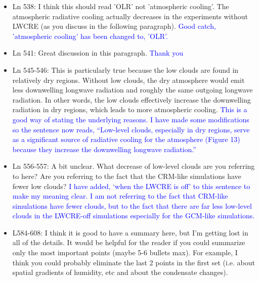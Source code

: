 \documentclass[draft]{agujournal2019}
\begin{document}
\begin{itemize}
  \item Ln 538: I think this should read 'OLR' not 'atmospheric cooling'. The atmospheric radiative cooling actually decreases in the experiments without LWCRE (as you discuss in the following paragraph). 
  \textcolor{blue}{Good catch, 'atmospheric cooling' has been changed to, 'OLR'.}
  
  \item Ln 541: Great discussion in this paragraph.  
  \textcolor{blue}{Thank you}
  
  \item Ln 545-546: This is particularly true because the low clouds are found in relatively dry regions. Without low clouds, the dry atmosphere would emit less downwelling longwave radiation and roughly the same outgoing longwave radiation. In other words, the low clouds effectively increase the downwelling radiation in dry regions, which leads to more atmospheric cooling.   
  \textcolor{blue}{This is a good way of stating the underlying reasons.  I have made some modifications so the sentence now 
  reads, ``Low-level clouds, especially in dry regions, serve as a significant source of  radiative cooling for the atmosphere (Figure 
  13) because they increase the downwelling longwave radiation.''}
  
  \item Ln 556-557: A bit unclear. What decrease of low-level clouds are you referring to here? Are you referring to the fact that the CRM-like simulations have fewer low clouds?
  \textcolor{blue}{I have added, `when the LWCRE is off' to this sentence to make my meaning clear.  I am not referring to the fact that CRM-like simulations have fewer clouds, but to the fact that there are far less low-level clouds in the LWCRE-off simulations 
  especially for the GCM-like simulations. }
  
  \item L584-608: I think it is good to have a summary here, but I'm getting lost in all of the details. It would be helpful for the reader if you could summarize only the most important points (maybe 5-6 bullets max). For example, I think you could probably eliminate the last 2 points in the first set (i.e. about spatial gradients of humidity, etc and about the condensate changes). 


\end{itemize}
\end{document}
